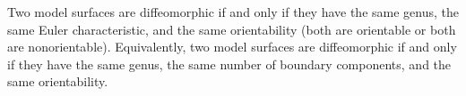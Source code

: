 Two model surfaces are diffeomorphic if and only if they have the same genus, the same Euler characteristic, and the same orientability (both are orientable or both are nonorientable). Equivalently, two model surfaces are diffeomorphic if and only if they have the same genus, the same number of boundary components, and the same orientability.

